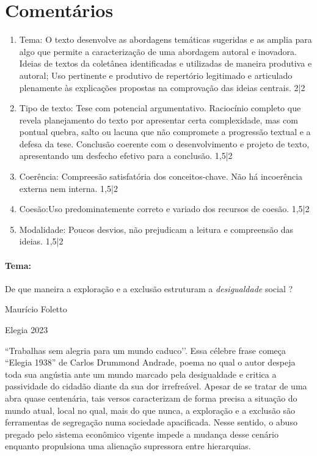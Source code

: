 \documentclass{article}
\begin{document}
\section*{Comentários}
\begin{enumerate}
\item Tema: O texto desenvolve as abordagens temáticas sugeridas e as amplia para algo que permite a caracterização de uma abordagem autoral e inovadora. Ideias de textos da coletânea identificadas e utilizadas de maneira produtiva e autoral; Uso pertinente e produtivo de repertório legitimado e articulado plenamente às explicações propostas na comprovação das ideias centrais. 2|2
\item Tipo de texto: Tese com potencial argumentativo. Raciocínio completo que revela planejamento do texto por apresentar certa complexidade, mas com pontual quebra, salto ou lacuna que não compromete a progressão textual e a defesa da tese. Conclusão coerente com o desenvolvimento e projeto de texto, apresentando um desfecho efetivo para a conclusão. 1,5|2
\item Coerência: Compreesão satisfatória dos conceitos-chave. Não há incoerência externa nem interna. 1,5|2
\item Coesão:Uso predominatemente correto e variado dos recursos de coesão. 1,5|2
\item Modalidade: Poucos desvios, não prejudicam a leitura e compreensão das ideias. 1,5|2
\end{enumerate}

\newpage
\paragraph{Tema:} De que maneira a exploração e a exclusão estruturam a \textit{desigualdade} social ?

\begin{flushright} Maurício Foletto \end{flushright}
       Elegia 2023

       
“Trabalhas sem alegria para um mundo caduco’’. Essa célebre frase começa “Elegia 1938” de Carlos Drummond Andrade, poema no qual o autor despeja toda sua angústia ante um mundo marcado pela desigualdade e critica a passividade do cidadão diante da sua dor irrefreável. Apesar de se tratar de uma abra quase centenária, tais versos caracterizam de forma precisa a situação do mundo atual, local no qual, mais do que nunca, a exploração e a exclusão são ferramentas de segregação numa sociedade apacificada. Nesse sentido, o abuso pregado pelo sistema econômico vigente impede a mudança desse cenário enquanto propulsiona uma alienação supressora entre hierarquias.
\end{document}
